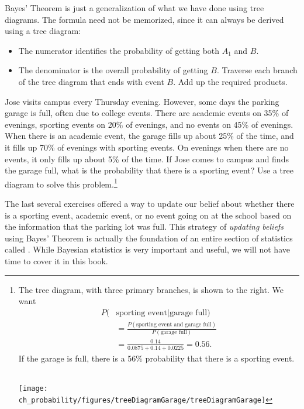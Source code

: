 Bayes' Theorem is just a generalization of what we have done using tree diagrams. The formula need not be memorized, since it can always be derived using a tree diagram:
\begin{itemize}
\setlength{\itemsep}{0mm}
\item The numerator identifies the probability of getting both $A_1$ and $B$.
\item The denominator is the overall probability of getting $B$.  Traverse each branch of the tree diagram that ends with event $B$.  Add up the required products.
\end{itemize}

\begin{exercise} \label{exerciseForParkingLotOnCampusBeingFullAndWhetherOrNotThereIsASportingEvent}
Jose visits campus every Thursday evening. However, some days the parking garage is full, often due to college events. There are academic events on 35\% of evenings, sporting events on 20\% of evenings, and no events on 45\% of evenings. When there is an academic event, the garage fills up about 25\% of the time, and it fills up 70\% of evenings with sporting events. On evenings when there are no events, it only fills up about 5\% of the time. If Jose comes to campus and finds the garage full, what is the probability that there is a sporting event? Use a tree diagram to solve this problem.\footnote{\begin{minipage}[t]{0.47\textwidth}
The tree diagram, with three primary branches, is shown to the right. We want
\begin{align*}
P(&\text{sporting event} | \text{garage full}) \\
&= \frac{P(\text{sporting event and garage full})}{P(\text{garage full})} \\
&=\frac{0.14}{0.0875 + 0.14 + 0.0225} = 0.56.
\end{align*}
If the garage is full, there is a 56\% probability that there is a sporting event. \vspace{0.1mm} \\\
\end{minipage}
\begin{minipage}[c]{0.5\textwidth}
\texttt{[image: ch\_probability/figures/treeDiagramGarage/treeDiagramGarage]}\vspace{-30mm}
\end{minipage}}
\end{exercise}

The last several exercises offered a way to update our belief about whether there is a sporting event, academic event, or no event going on at the school based on the information that the parking lot was full. This strategy of \emph{updating beliefs} using Bayes' Theorem is actually the foundation of an entire section of statistics called . While Bayesian statistics is very important and useful, we will not have time to cover it in this book.

